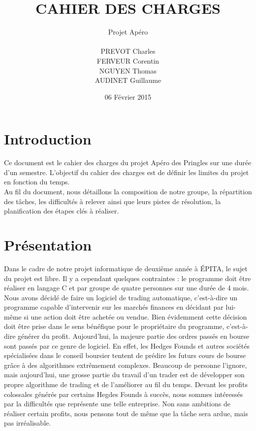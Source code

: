 \documentclass[a4paper,12pt]{article}
\title{CAHIER DES CHARGES}
\author{Projet Apéro \\ \\ PREVOT Charles \\ FERVEUR Corentin \\ NGUYEN Thomas \\ AUDINET Guillaume}
\date{06 Février 2015}
\begin{document}
\begin{titlepage}
\maketitle
\end{titlepage}

\tableofcontents
\newpage

\section{Introduction}
Ce document est le cahier des charges du projet Apéro des Pringles sur une durée d'un semestre.
L'objectif du cahier des charges est de définir les limites du projet en fonction du temps. \\

Au fil du document, nous détaillons la composition de notre groupe, la répartition des tâches, les difficultés à relever ainsi que leurs pistes de résolution, la planification des étapes clés à réaliser.\\

\section{Présentation}
Dans le cadre de notre projet informatique de deuxième année à ÉPITA, le sujet du projet est libre. Il y a cependant quelques contraintes : le programme doit être réaliser en langage C et par groupe de quatre personnes sur une durée de 4 mois. Nous avons décidé de faire un logiciel de trading automatique, c'est-à-dire un programme capable d'intervenir sur les marchés finances en décidant par lui-même si une action doit être achetée ou vendue. Bien évidemment cette décision doit être prise dans le sens bénéfique pour le propriétaire du programme, c'est-à-dire générer du profit. Aujourd'hui, la majeure partie des ordres passés en bourse sont passés par ce genre de logiciel. En effet, les Hedges Founds et autres sociétés spécialisées dans le conseil boursier tentent de prédire les futurs cours de bourse grâce à des algorithmes extrêmement complexes. Beaucoup de personne l'ignore, mais aujourd'hui, une grosse partie du travail d'un trader est de développer son propre algorithme de trading et de l'améliorer au fil du temps. Devant les profits colossales générés par certains Hegdes Founds à succès, nous sommes intéressés par la difficultés que représente une telle entreprise. Non sans ambitions de réaliser certain profits, nous pensons tout de même que la tâche sera ardue, mais pas irréalisable.
\end{document}
